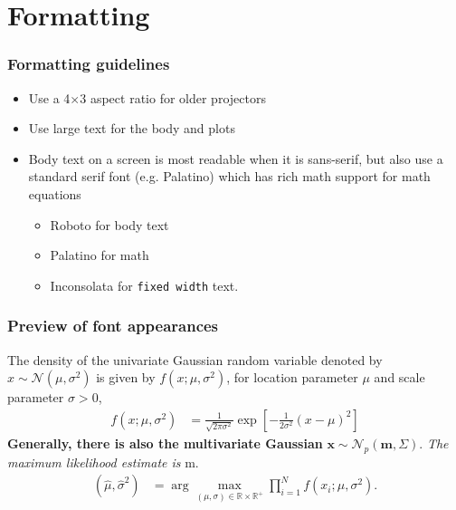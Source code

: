 \section{Formatting}


\begin{frame}
  \frametitle{Formatting guidelines}
    \begin{itemize}
    \item Use a 4$\times$3 aspect ratio for older projectors
    \item Use \large{large} \normalsize text for the body and plots
  \item Body text on a screen is most readable when it is sans-serif,
    but also use a standard serif font (e.g. Palatino) which has rich
    math support for math equations
    \begin{itemize}
    \item Roboto for body text
    \item Palatino for math
    \item Inconsolata for \texttt{fixed width} text.
    \end{itemize}
  \end{itemize}
  \cite*{horseshoe}
\end{frame}


\begin{frame}
  \frametitle{Preview of font appearances}

  The density of the univariate Gaussian random variable denoted by
  $x \sim \mathcal{N}(\mu, \sigma^2)$ is given by
  $f(x; \mu, \sigma^2)$, for location parameter $\mu$ and scale
  parameter $\sigma > 0$,
%
  \begin{align*}
    f(x; \mu, \sigma^2) &= \frac{1}{\sqrt{2\pi\sigma^2}} \exp 
           \left[
           -\frac{1}{2\sigma^2}(x - \mu)^2
           \right]
  \end{align*}
%
  \textbf{Generally, there is also the multivariate Gaussian}
  $\mathbf{x} \sim \mathcal{N}_p(\mathbf{m}, \Sigma)$. \emph{The maximum
  likelihood estimate is} {\textmu}m. 
  \begin{align*}
    (\hat{\mu}, \hat{\sigma}^2)
    &= \arg \max_{(\mu, \sigma) \in \mathbb{R} \times \mathbb{R}^+} \prod_{i=1}^N f(x_i; \mu, \sigma^2).
  \end{align*}
  
\end{frame}



